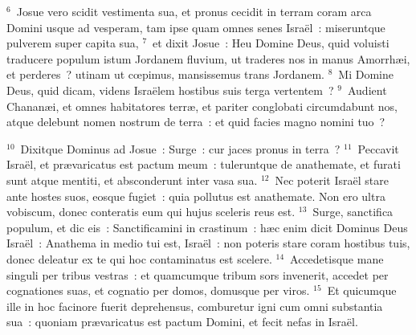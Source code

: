 ${}^{6}$~Josue vero scidit vestimenta sua, et pronus cecidit in terram coram arca Domini usque ad vesperam, tam ipse quam omnes senes Isra\"el~: miseruntque pulverem super capita sua,
${}^{7}$~et dixit Josue~: Heu Domine Deus, quid voluisti traducere populum istum Jordanem fluvium, ut traderes nos in manus Amorrh\ae i, et perderes~? utinam ut cœpimus, mansissemus trans Jordanem.
${}^{8}$~Mi Domine Deus, quid dicam, videns Isra\"elem hostibus suis terga vertentem~?
${}^{9}$~Audient Chanan\ae i, et omnes habitatores terr\ae , et pariter conglobati circumdabunt nos, atque delebunt nomen nostrum de terra~: et quid facies magno nomini tuo~?


${}^{10}$~Dixitque Dominus ad Josue~: Surge~: cur jaces pronus in terra~?
${}^{11}$~Peccavit Isra\"el, et pr\ae varicatus est pactum meum~: tuleruntque de anathemate, et furati sunt atque mentiti, et absconderunt inter vasa sua.
${}^{12}$~Nec poterit Isra\"el stare ante hostes suos, eosque fugiet~: quia pollutus est anathemate. Non ero ultra vobiscum, donec conteratis eum qui hujus sceleris reus est.
${}^{13}$~Surge, sanctifica populum, et dic eis~: Sanctificamini in crastinum~: h\ae c enim dicit Dominus Deus Isra\"el~: Anathema in medio tui est, Isra\"el~: non poteris stare coram hostibus tuis, donec deleatur ex te qui hoc contaminatus est scelere.
${}^{14}$~Accedetisque mane singuli per tribus vestras~: et quamcumque tribum sors invenerit, accedet per cognationes suas, et cognatio per domos, domusque per viros.
${}^{15}$~Et quicumque ille in hoc facinore fuerit deprehensus, comburetur igni cum omni substantia sua~: quoniam pr\ae varicatus est pactum Domini, et fecit nefas in Isra\"el.


